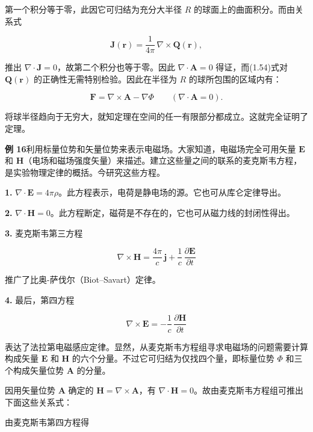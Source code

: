 \documentclass[11pt,a4paper,oneside]{ctexbook}
\newcommand{\ve}[1]{\bm{#1}}
\begin{document}
第一个积分等于零，此因它可归结为充分大半径 $R$ 的球面上的曲面积分。而由关系式

\begin{equation*}
\ve{J}(\ve{r}) = \frac{1}{4\pi}\, \nabla \times \ve{Q}(\ve{r}),
\end{equation*}

推出 $\nabla \cdot \ve{J} = 0$，故第二个积分也等于零。因此 $\nabla \cdot \ve{A} = 0$ 得证，而(1.54)式对 $\ve{Q}(\ve{r})$ 的正确性无需特别检验。因此在半径为 $R$ 的球所包围的区域内有：

\begin{equation*}
\ve{F} = \nabla \times \ve{A} - \nabla\Phi \qquad (\nabla \cdot \ve{A} = 0).
\end{equation*}

将球半径趋向于无穷大，就知定理在空间的任一有限部分都成立。这就完全证明了定理。

\textbf{例 16}\quad 利用标量位势和矢量位势来表示电磁场。大家知道，电磁场完全可用矢量 $\ve{E}$ 和 $\ve{H}$（电场和磁场强度矢量）来描述。建立这些量之间的联系的麦克斯韦方程，是实验物理定律的概括。今研究这些方程。

\textbf{1.} $\nabla \cdot \ve{E} = 4\pi\rho$。此方程表示，电荷是静电场的源。它也可从库仑定律导出。

\textbf{2.} $\nabla \cdot \ve{H} = 0$。此方程断定，磁荷是不存在的，它也可从磁力线的封闭性得出。

\textbf{3.} 麦克斯韦第三方程

\begin{equation*}
\nabla \times \ve{H} = \frac{4\pi}{c}\, \ve{j} + \frac{1}{c}\, \frac{\partial\ve{E}}{\partial t}
\end{equation*}

推广了比奥-萨伐尔（Biot--Savart）定律。

\textbf{4.} 最后，第四方程

\begin{equation*}
\nabla \times \ve{E} = -\frac{1}{c}\, \frac{\partial\ve{H}}{\partial t}
\end{equation*}

表达了法拉第电磁感应定律。显然，从麦克斯韦方程组寻求电磁场的问题需要计算构成矢量 $\ve{E}$ 和 $\ve{H}$ 的六个分量。不过它可归结为仅找四个量，即标量位势 $\Phi$ 和三个构成矢量位势 $\ve{A}$ 的分量。

因用矢量位势 $\ve{A}$ 确定的 $\ve{H} = \nabla \times \ve{A}$，有 $\nabla \cdot \ve{H} = 0$。故由麦克斯韦方程组可推出下面这些关系式：

由麦克斯韦第四方程得
\end{document}
